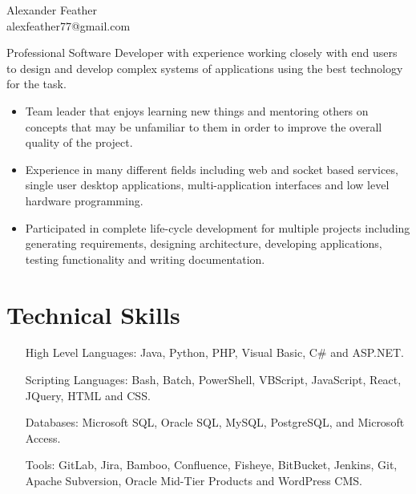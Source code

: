 \documentclass[11pt, letterpaper]{article}
\begin{document}
\pagestyle{empty}
\selectfont
\begin{center}
{\huge Alexander Feather} \\
\vspace{0.1cm}
alexfeather77@gmail.com
\end{center}
\vspace{-0.2cm}
Professional Software Developer with experience working closely with end users to design and develop complex systems of applications using the best technology for the task.
\begin{itemize}[itemsep=0cm, parsep=0.2cm]
    \item Team leader that enjoys learning new things and mentoring others on concepts that may be unfamiliar to them in order to improve the overall quality of the project.
    \item Experience in many different fields including web and socket based services, single user desktop applications, multi-application interfaces and low level hardware programming.
    \item Participated in complete life-cycle development for multiple projects including generating requirements, designing architecture, developing applications, testing functionality and writing documentation. 
\end{itemize}
\vspace{-0.9cm}
\section*{\selectfont Technical Skills}
\vspace{-0.2cm}
\begin{itemize}[itemsep=0cm, leftmargin=2in, align=parleft, labelwidth=1.6in]
    \item[High Level Languages:] Java, Python, PHP, Visual Basic, C\# and ASP.NET\@.
    \item[Scripting Languages:] Bash, Batch, PowerShell, VBScript, JavaScript, React, JQuery, HTML and CSS\@.
    \item[Databases:] Microsoft SQL, Oracle SQL, MySQL, PostgreSQL, and Microsoft Access.
    \item[Tools:] GitLab, Jira, Bamboo, Confluence, Fisheye, BitBucket, Jenkins, Git, Apache Subversion, Oracle Mid-Tier Products and WordPress CMS\@.
\end{itemize}
\vspace{-1.1cm}
\end{document}
